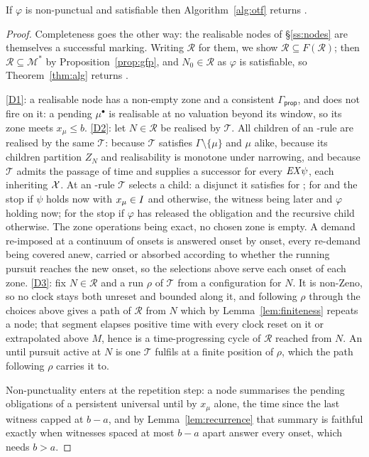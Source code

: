 
\begin{theorem}[Completeness]\label{thm:completeness}
If $\varphi$ is non-punctual and satisfiable then Algorithm~\ref{alg:otf} returns \SAT.
\end{theorem}
\begin{proof}
Completeness goes the other way: the realisable nodes of \S\ref{ss:nodes} are themselves a successful
marking. Writing $\mathcal R$ for them, we show $\mathcal R\subseteq F(\mathcal R)$; then $\mathcal R\subseteq\mathcal M^{*}$ by
Proposition~\ref{prop:gfp}, and $N_0\in \mathcal R$ as $\varphi$ is satisfiable, so Theorem~\ref{thm:alg}
returns \SAT.

\ref{D1}: a realisable node has a non-empty zone and a consistent $\Gamma_{\mathsf{prop}}$, and
 does not fire on it: a pending $\mu^\bullet$ is realisable at no valuation beyond
its window, so its zone meets $x_\mu\le b$.
\ref{D2}: let $N\in \mathcal R$ be realised by $\mathcal T$. All children of an \ANDn-rule are realised by the
same $\mathcal T$:  because $\mathcal T$ satisfies $\Gamma\setminus\{\mu\}$ and $\mu$
alike,  because its children partition $Z_N$ and realisability is monotone under
narrowing,  and  because $\mathcal T$ admits the passage of time and
supplies a successor for every $\mathit{EX}\psi$, each inheriting $\mathcal{X}$. At an \ORn-rule $\mathcal T$ selects
a child: a disjunct it satisfies for ; for  and  the
stop if $\psi$ holds now with $x_\mu\in I$ and  otherwise, the witness being later and
$\varphi$ holding now; for  the stop if $\varphi$ has
released the obligation and the recursive child otherwise. The zone operations being exact, no chosen
zone is empty. A demand re-imposed at a continuum of onsets is answered onset by onset, every re-demand being
covered anew, carried or absorbed according to whether the running pursuit reaches the new onset,
so the selections above serve each onset of each zone.
\ref{D3}: fix $N\in \mathcal R$ and a run $\rho$ of $\mathcal T$ from a configuration for $N$. It
is non-Zeno, so no clock stays both unreset and bounded along it, and following $\rho$ through the
choices above gives a path of $\mathcal R$ from $N$ which by Lemma~\ref{lem:finiteness} repeats a node; that
segment elapses positive time with every clock reset on it or extrapolated above $M$, hence is a
time-progressing cycle of $\mathcal R$ reached from $N$. An until pursuit active at $N$ is one $\mathcal T$
fulfils at a finite position of $\rho$, which the path following $\rho$ carries it to.

Non-punctuality enters at the repetition step: a node summarises the pending obligations of a
persistent universal until by $x_\mu$ alone, the time since the last witness capped at $b-a$, and by
Lemma~\ref{lem:recurrence} that summary is faithful exactly when witnesses spaced at most $b-a$ apart
answer every onset, which needs $b>a$.
\end{proof}


